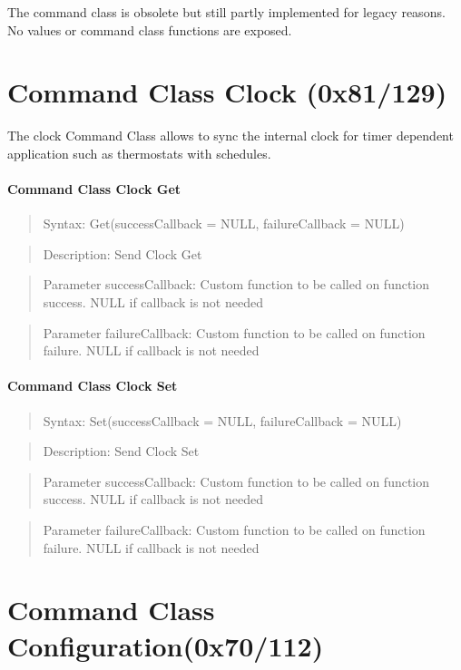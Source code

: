 The command class is obsolete but still partly implemented for legacy reasons. No values 
or command class functions are exposed.

  
\section{Command Class Clock (0x81/129)}

The clock Command Class allows to sync the internal clock for timer dependent application such as thermostats with schedules.

\paragraph {Command Class Clock Get}
\begin{quote} Syntax: Get(successCallback = NULL, failureCallback = NULL)\end{quote}
\begin{quote} Description: Send Clock Get\end{quote}
\begin{quote} Parameter successCallback: Custom function to be called on function success. NULL if callback is not needed\end{quote}
\begin{quote} Parameter failureCallback: Custom function to be called on function failure. NULL if callback is not needed\end{quote}

\paragraph {Command Class Clock Set}
\begin{quote} Syntax: Set(successCallback = NULL, failureCallback = NULL)\end{quote}
\begin{quote} Description: Send Clock Set\end{quote}
\begin{quote} Parameter successCallback: Custom function to be called on function success. NULL if callback is not needed\end{quote}
\begin{quote} Parameter failureCallback: Custom function to be called on function failure. NULL if callback is not needed\end{quote}

 
\section{Command Class Configuration(0x70/112)} 

